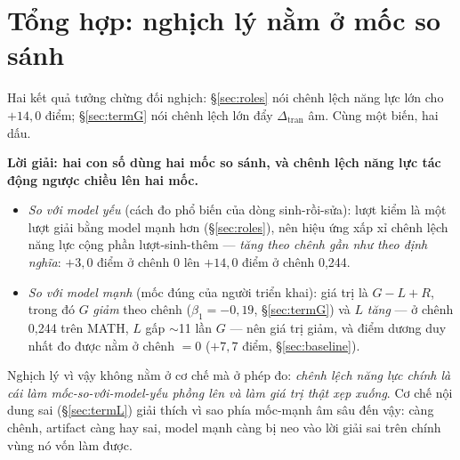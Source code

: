 \documentclass[12pt,a4paper]{article}
\newcommand{\dceil}{\Delta_{\mathrm{tran}}}
\begin{document}
\section{Tổng hợp: nghịch lý nằm ở mốc so sánh}\label{sec:synthesis}

Hai kết quả tưởng chừng đối nghịch: \S\ref{sec:roles} nói chênh lệch năng lực lớn cho
$+14{,}0$ điểm; \S\ref{sec:termG} nói chênh lệch lớn đẩy $\dceil$ âm. Cùng một biến, hai dấu.

\textbf{Lời giải: hai con số dùng hai mốc so sánh, và chênh lệch năng lực tác động ngược chiều
lên hai mốc.}
\begin{itemize}\itemsep2pt
\item \emph{So với model yếu} (cách đo phổ biến của dòng sinh-rồi-sửa): lượt kiểm là một
      lượt giải bằng model mạnh hơn (\S\ref{sec:roles}), nên hiệu ứng xấp xỉ chênh lệch năng
      lực cộng phần lượt-sinh-thêm --- \emph{tăng theo chênh gần như theo định nghĩa}: $+3{,}0$
      điểm ở chênh 0 lên $+14{,}0$ điểm ở chênh 0,244.
\item \emph{So với model mạnh} (mốc đúng của người triển khai): giá trị là $G - L + R$, trong
      đó $G$ \emph{giảm} theo chênh ($\beta_1 = -0{,}19$, \S\ref{sec:termG}) và $L$ \emph{tăng}
      --- ở chênh 0,244 trên MATH, $L$ gấp $\sim$11 lần $G$ --- nên giá trị giảm, và điểm dương
      duy nhất đo được nằm ở chênh $= 0$ ($+7{,}7$ điểm, \S\ref{sec:baseline}).
\end{itemize}
Nghịch lý vì vậy không nằm ở cơ chế mà ở phép đo: \emph{chênh lệch năng lực chính là cái làm
mốc-so-với-model-yếu phồng lên và làm giá trị thật xẹp xuống}. Cơ chế nội dung sai
(\S\ref{sec:termL}) giải thích vì sao phía mốc-mạnh âm sâu đến vậy: càng chênh, artifact càng
hay sai, model mạnh càng bị neo vào lời giải sai trên chính vùng nó vốn làm được.
\end{document}
